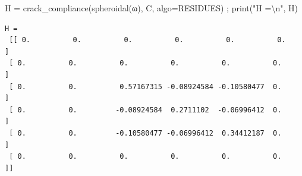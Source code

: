 \documentclass[
  letterpaper,
  DIV=11,
  numbers=noendperiod]{scrreprt}
\newenvironment{Shaded}{\begin{snugshade}}{\end{snugshade}}
\newcommand{\BuiltInTok}[1]{\textcolor[rgb]{0.00,0.23,0.31}{#1}}
\newcommand{\CharTok}[1]{\textcolor[rgb]{0.13,0.47,0.30}{#1}}
\newcommand{\NormalTok}[1]{\textcolor[rgb]{0.00,0.23,0.31}{#1}}
\newcommand{\OperatorTok}[1]{\textcolor[rgb]{0.37,0.37,0.37}{#1}}
\newcommand{\StringTok}[1]{\textcolor[rgb]{0.13,0.47,0.30}{#1}}
\begin{document}
\begin{Shaded}
\begin{Highlighting}[]
\NormalTok{H }\OperatorTok{=}\NormalTok{ crack\_compliance(spheroidal(ω), C, algo}\OperatorTok{=}\NormalTok{RESIDUES) }\OperatorTok{;} \BuiltInTok{print}\NormalTok{(}\StringTok{"H =}\CharTok{\textbackslash{}n}\StringTok{"}\NormalTok{, H)}
\end{Highlighting}
\end{Shaded}

\begin{verbatim}
H =
 [[ 0.          0.          0.          0.          0.          0.        ]
 [ 0.          0.          0.          0.          0.          0.        ]
 [ 0.          0.          0.57167315 -0.08924584 -0.10580477  0.        ]
 [ 0.          0.         -0.08924584  0.2711102  -0.06996412  0.        ]
 [ 0.          0.         -0.10580477 -0.06996412  0.34412187  0.        ]
 [ 0.          0.          0.          0.          0.          0.        ]]
\end{verbatim}
\end{document}
